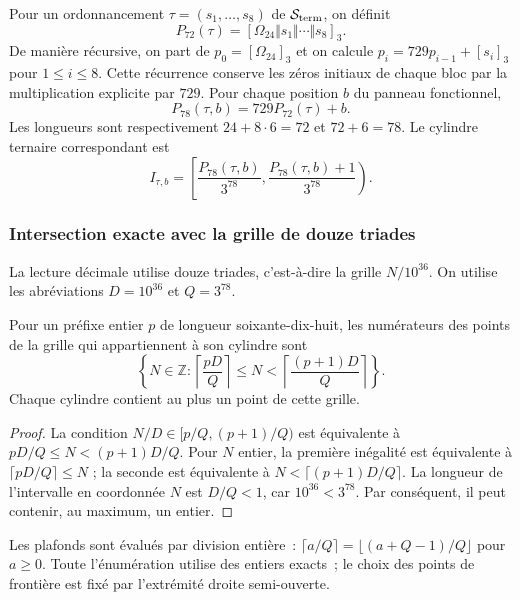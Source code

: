 Pour un ordonnancement $\tau=(s_1,\ldots,s_8)$ de
$\mathcal S_{\rm term}$, on définit
\[
 P_{72}(\tau)=[\Omega_{24}\Vert s_1\Vert\cdots\Vert s_8]_3.
\]
De manière récursive, on part de $p_0=[\Omega_{24}]_3$ et on calcule
$p_i=729p_{i-1}+[s_i]_3$ pour $1\leq i\leq8$. Cette récurrence
conserve les zéros initiaux de chaque bloc par la multiplication
explicite par $729$. Pour chaque position $b$ du panneau fonctionnel,
\[
 P_{78}(\tau,b)=729P_{72}(\tau)+b.
\]
Les longueurs sont respectivement $24+8\cdot6=72$ et $72+6=78$.
Le cylindre ternaire correspondant est
\begin{equation}
 I_{\tau,b}=
 \left[\frac{P_{78}(\tau,b)}{3^{78}},
       \frac{P_{78}(\tau,b)+1}{3^{78}}\right).
 \label{act21:eq:kdes-cilindro}
\end{equation}

\subsubsection{Intersection exacte avec la grille de douze triades}

La lecture décimale utilise douze triades, c'est-à-dire la grille $N/10^{36}$. On utilise les abréviations $D=10^{36}$ et $Q=3^{78}$.

\begin{lemma}
Pour un préfixe entier $p$ de longueur soixante-dix-huit, les numérateurs
des points de la grille qui appartiennent à son cylindre sont
\begin{equation}
 \left\{N\in\mathbb Z:
 \left\lceil\frac{pD}{Q}\right\rceil
 \leq N<
 \left\lceil\frac{(p+1)D}{Q}\right\rceil\right\}.
 \label{act21:eq:kdes-rejilla}
\end{equation}
Chaque cylindre contient au plus un point de cette grille.
\end{lemma}
\begin{proof}
La condition $N/D\in[p/Q,(p+1)/Q)$ est équivalente à
$pD/Q\leq N<(p+1)D/Q$. Pour $N$ entier, la première inégalité
est équivalente à $\lceil pD/Q\rceil\leq N$ ; la seconde est équivalente à
$N<\lceil(p+1)D/Q\rceil$. La longueur de l'intervalle en coordonnée
$N$ est $D/Q<1$, car $10^{36}<3^{78}$. Par conséquent, il peut contenir,
au maximum, un entier.
\end{proof}

Les plafonds sont évalués par division entière :
$\lceil a/Q\rceil=\lfloor(a+Q-1)/Q\rfloor$ pour $a\geq0$.
Toute l'énumération utilise des entiers exacts ; le choix des points de frontière est fixé par l'extrémité droite semi-ouverte.

